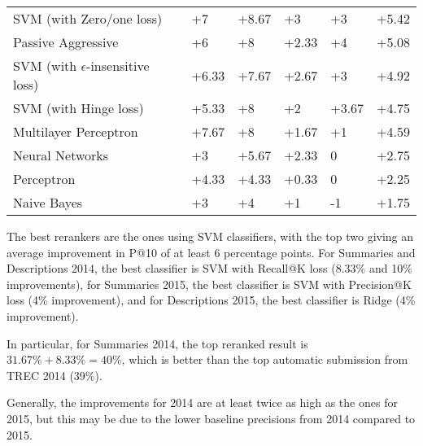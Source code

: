 \begin{table}[h!]
{\begin{tabular}{@{}llllll@{}}
SVM (with Zero/one loss)            	& +7                       & +8.67                       & +3                       & +3                          & +5.42             \\
Passive Aggressive              	& +6                       & +8                          & +2.33                    & +4                          & +5.08             \\
SVM (with $\epsilon$-insensitive loss)	& +6.33                    & +7.67                       & +2.67                    & +3                          & +4.92             \\
SVM (with Hinge loss)              	& +5.33                    & +8                          & +2                       & +3.67                       & +4.75             \\
Multilayer Perceptron            	& +7.67                    & +8                          & +1.67                    & +1                          & +4.59             \\
Neural Networks                  	& +3                       & +5.67                       & +2.33                    & 0                           & +2.75             \\
Perceptron                          	& +4.33                    & +4.33                       & +0.33                    & 0                           & +2.25             \\
Naive Bayes                        	& +3                       & +4                          & +1                       & -1                          & +1.75             \\ \bottomrule
\end{tabular}%
}
\end{table}

The best rerankers are the ones using SVM classifiers, with the top two giving an average improvement in P@10 of at least 6 percentage
points. For Summaries and Descriptions 2014, the best classifier is SVM with Recall@K loss (8.33\% and 10\% improvements),
for Summaries 2015, the best classifier is SVM with Precision@K loss (4\% improvement),
and for Descriptions 2015, the best classifier is Ridge (4\% improvement).

In particular, for Summaries 2014, the top reranked result is $31.67\%+8.33\% = 40\%$, which is better than the top automatic submission
from TREC 2014 (39\%).

Generally, the improvements for 2014 are at least
twice as high as the ones for 2015, but this may be due to the lower baseline precisions from 2014 compared to 2015.

